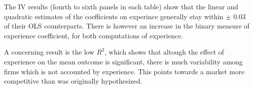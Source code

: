 The IV results (fourth to sixth panels in each table) show that  the linear and quadratic estimates of the coefficients on experince generally stay within $\pm$ 0.03 of their OLS counterparts. There is however an increase in the binary measure of experience coefficient, for both computations of experience.

A concerning result is the low $R^2$, which shows that altough the effect of experience on the mean outcome is significant, there is much variability among firms which is not accounted by experience. This points towards a market more competitive than was originally hypothesized.

\begin{table}[!htbp] \centering
  \caption{Regression results for OLS and IV specifications where experience is computed in 2-year rolling periods}
  \label{tab:table_exp_1}
\end{table}
